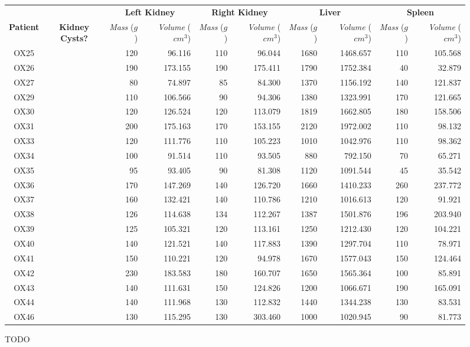 \begin{landscape}
\begin{figure}[p]
\footnotesize
\begin{tabular}{c|c|rr|rr|rr|rr}
&& \multicolumn{2}{|c|}{\textbf{Left Kidney}} & \multicolumn{2}{|c|}{\textbf{Right Kidney}} & \multicolumn{2}{|c|}{\textbf{Liver}} & \multicolumn{2}{|c}{\textbf{Spleen}} \\
\textbf{Patient} & \textbf{Kidney Cysts?} & \emph{Mass} ($g$) & \emph{Volume} ($\mathit{cm}^3$) & \emph{Mass} ($g$) & \emph{Volume} ($\mathit{cm}^3$) & \emph{Mass} ($g$) & \emph{Volume} ($\mathit{cm}^3$) & \emph{Mass} ($g$) & \emph{Volume} ($\mathit{cm}^3$) \\
\hline
\hline
OX25 & & 120 &  96.116 & 110 &  96.044 & 1680 & 1468.657 & 110 & 105.568 \\
OX26 & & 190 & 173.155 & 190 & 175.411 & 1790 & 1752.384 &  40 &  32.879 \\
OX27 & &  80 &  74.897 &  85 &  84.300 & 1370 & 1156.192 & 140 & 121.837 \\
OX29 & & 110 & 106.566 &  90 &  94.306 & 1380 & 1323.991 & 170 & 121.665 \\
OX30 & & 120 & 126.524 & 120 & 113.079 & 1819 & 1662.805 & 180 & 158.506 \\
OX31 & & 200 & 175.163 & 170 & 153.155 & 2120 & 1972.002 & 110 &  98.132 \\
OX33 & & 120 & 111.776 & 110 & 105.223 & 1010 & 1042.976 & 110 &  98.362 \\
OX34 & & 100 &  91.514 & 110 &  93.505 &  880 &  792.150 &  70 &  65.271 \\
OX35 & &  95 &  93.405 &  90 &  81.308 & 1120 & 1091.544 &  45 &  35.542 \\
OX36 & & 170 & 147.269 & 140 & 126.720 & 1660 & 1410.233 & 260 & 237.772 \\
OX37 & & 160 & 132.421 & 140 & 110.786 & 1210 & 1016.613 & 120 &  91.921 \\
OX38 & & 126 & 114.638 & 134 & 112.267 & 1387 & 1501.876 & 196 & 203.940 \\
OX39 & & 125 & 105.321 & 120 & 113.161 & 1250 & 1212.430 & 120 & 104.221 \\
OX40 & & 140 & 121.521 & 140 & 117.883 & 1390 & 1297.704 & 110 &  78.971 \\
OX41 & & 150 & 110.221 & 120 &  94.978 & 1670 & 1577.043 & 150 & 124.464 \\
OX42 & & 230 & 183.583 & 180 & 160.707 & 1650 & 1565.364 & 100 &  85.891 \\
OX43 & & 140 & 111.631 & 150 & 124.826 & 1200 & 1066.671 & 190 & 165.091 \\
OX44 & & 140 & 111.968 & 130 & 112.832 & 1440 & 1344.238 & 130 &  83.531 \\
OX46 & & 130 & 115.295 & 130 & 303.460 & 1000 & 1020.945 &  90 &  81.773
\end{tabular}
\caption{TODO}
\label{fig:validation-volcalc-table}
\end{figure}
\end{landscape}

